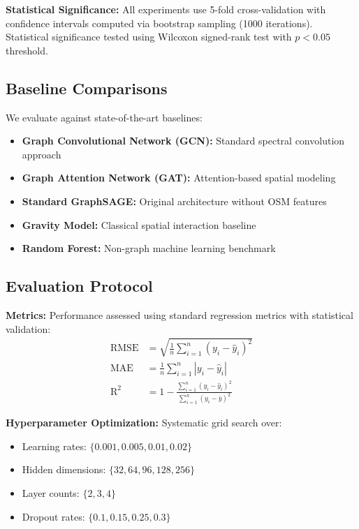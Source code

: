 \documentclass[twocolumn,11pt]{IEEEtran}  %
\begin{document}
\textbf{Statistical Significance:} All experiments use 5-fold cross-validation with confidence intervals computed via bootstrap sampling (1000 iterations). Statistical significance tested using Wilcoxon signed-rank test with $p < 0.05$ threshold.

\subsection{Baseline Comparisons}

We evaluate against state-of-the-art baselines:
\begin{itemize}
\item \textbf{Graph Convolutional Network (GCN):} Standard spectral convolution approach
\item \textbf{Graph Attention Network (GAT):} Attention-based spatial modeling
\item \textbf{Standard GraphSAGE:} Original architecture without OSM features
\item \textbf{Gravity Model:} Classical spatial interaction baseline
\item \textbf{Random Forest:} Non-graph machine learning benchmark
\end{itemize}

\subsection{Evaluation Protocol}

\textbf{Metrics:} Performance assessed using standard regression metrics with statistical validation:
\begin{align}
\text{RMSE} &= \sqrt{\frac{1}{n}\sum_{i=1}^{n}(y_i - \hat{y}_i)^2} \\
\text{MAE} &= \frac{1}{n}\sum_{i=1}^{n}|y_i - \hat{y}_i| \\
\text{R}^2 &= 1 - \frac{\sum_{i=1}^{n}(y_i - \hat{y}_i)^2}{\sum_{i=1}^{n}(y_i - \bar{y})^2}
\end{align}

\textbf{Hyperparameter Optimization:} Systematic grid search over:
\begin{itemize}
\item Learning rates: $\{0.001, 0.005, 0.01, 0.02\}$
\item Hidden dimensions: $\{32, 64, 96, 128, 256\}$
\item Layer counts: $\{2, 3, 4\}$
\item Dropout rates: $\{0.1, 0.15, 0.25, 0.3\}$
\end{itemize}
\end{document}
